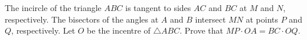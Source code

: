 The incircle of the triangle $ABC$ is tangent to sides $AC$ and $BC$ at $M$ and $N$,  respectively. The bisectors of the angles at $A$ and $B$ intersect $MN$ at points $P$ and $Q$,  respectively. Let $O$ be the incentre of $\triangle ABC$. Prove that $MP\cdot OA=BC\cdot OQ$.